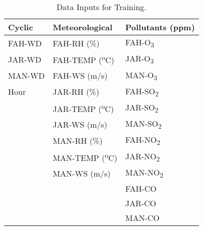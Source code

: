 \begin{table}[H]
\centering
\caption{Data Inputs for Training.}
\label{tb:data-training}
\begin{tabular}{@{}lll@{}}
\toprule
\textbf{Cyclic} & \textbf{Meteorological} & \textbf{Pollutants (ppm)} \\ \midrule
FAH-WD & FAH-RH (\%) & FAH-O\textsubscript{3} \\
JAR-WD & FAH-TEMP (\textsuperscript{o}C) & JAR-O\textsubscript{3} \\
MAN-WD & FAH-WS (m/s) & MAN-O\textsubscript{3} \\
Hour & JAR-RH (\%) & FAH-SO\textsubscript{2} \\
 & JAR-TEMP (\textsuperscript{o}C) & JAR-SO\textsubscript{2} \\
 & JAR-WS (m/s) & MAN-SO\textsubscript{2} \\
 & MAN-RH (\%) & FAH-NO\textsubscript{2} \\
 & MAN-TEMP (\textsuperscript{o}C) & JAR-NO\textsubscript{2} \\
 & MAN-WS (m/s) & MAN-NO\textsubscript{2} \\
 &  & FAH-CO \\
 &  & JAR-CO \\
 &  & MAN-CO \\ \bottomrule
\end{tabular}
\end{table}
